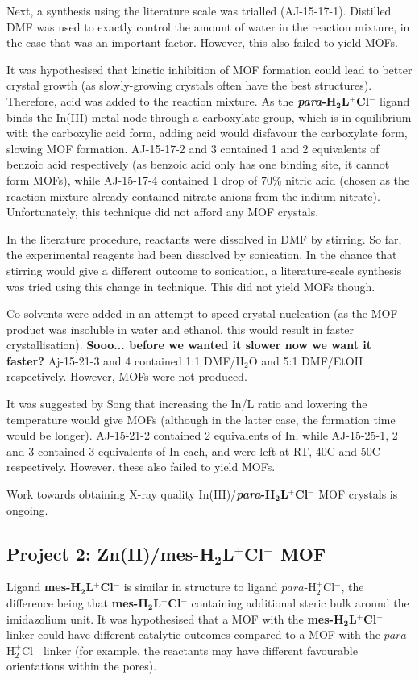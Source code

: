 \documentclass[12pt,a4paper]{article}
\begin{document}
Next, a synthesis using the literature scale was trialled (AJ-15-17-1). Distilled DMF was used to exactly control the amount of water in the reaction mixture, in the case that was an important factor. However, this also failed to yield MOFs.

It was hypothesised that kinetic inhibition of MOF formation could lead to better crystal growth (as slowly-growing crystals often have the best structures). Therefore, acid was added to the reaction mixture. As the \textbf{\emph{para}-H$\bm{_2}$L$\bm{^+}$Cl$\bm{^-}$} ligand binds the In(III) metal node through a carboxylate group, which is in equilibrium with the carboxylic acid form, adding acid would disfavour the carboxylate form, slowing MOF formation. AJ-15-17-2 and 3 contained 1 and 2 equivalents of benzoic acid respectively (as benzoic acid only has one binding site, it cannot form MOFs), while AJ-15-17-4 contained 1 drop of 70\% nitric acid (chosen as the reaction mixture already contained nitrate anions from the indium nitrate). Unfortunately, this technique did not afford any MOF crystals.

In the literature procedure, reactants were dissolved in DMF by stirring. So far, the experimental reagents had been dissolved by sonication. In the chance that stirring would give a different outcome to sonication, a literature-scale synthesis was tried using this change in technique. This did not yield MOFs though.

Co-solvents were added in an attempt to speed crystal nucleation (as the MOF product was insoluble in water and ethanol, this would result in faster crystallisation). \textbf{Sooo... before we wanted it slower now we want it faster?} Aj-15-21-3 and 4 contained 1:1 DMF/H$_2$O and 5:1 DMF/EtOH respectively. However, MOFs were not produced.

It was suggested by Song that increasing the In/L ratio and lowering the temperature would give MOFs (although in the latter case, the formation time would be longer). AJ-15-21-2 contained 2 equivalents of In, while AJ-15-25-1, 2 and 3 contained 3 equivalents of In each, and were left at RT, 40\degree C and 50\degree C respectively. However, these also failed to yield MOFs.

Work towards obtaining X-ray quality In(III)/\textbf{\emph{para}-H$\bm{_2}$L$\bm{^+}$Cl$\bm{^-}$} MOF crystals is ongoing.

\subsection{Project 2: Zn(II)/\textbf{mes-H$\bm{_2}$L$\bm{^+}$Cl$\bm{^-}$} MOF}\label{sec:dis-zn}
Ligand \textbf{mes-H$\bm{_2}$L$\bm{^+}$Cl$\bm{^-}$} is similar in structure to ligand $para$-H$_2^+$Cl$^-$, the difference being that \textbf{mes-H$\bm{_2}$L$\bm{^+}$Cl$\bm{^-}$} containing additional steric bulk around the imidazolium unit. It was hypothesised that a MOF with the \textbf{mes-H$\bm{_2}$L$\bm{^+}$Cl$\bm{^-}$} linker could have different catalytic outcomes compared to a MOF with the $para$-H$_2^+$Cl$^-$ linker (for example, the reactants may have different favourable orientations within the pores).
\end{document}
